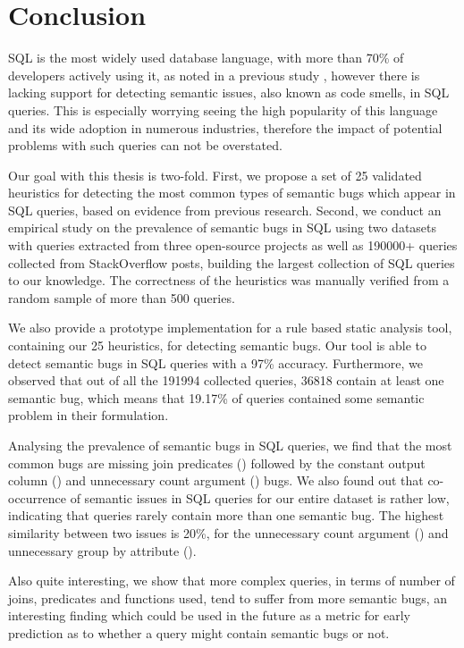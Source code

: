 \chapter{Conclusion}
\label{chapter:conclusion}

SQL is the most widely used database language, with more than 70\% of developers actively using it, as noted in a previous study \cite{P999}, however there is lacking support for detecting semantic issues, also known as code smells, in SQL queries. This is especially worrying seeing the high popularity of this language and its wide adoption in numerous industries, therefore the impact of potential problems with such queries can not be overstated.

Our goal with this thesis is two-fold. First, we propose a set of 25 validated heuristics for detecting the most common types of semantic bugs which appear in SQL queries, based on evidence from previous research. Second, we conduct an empirical study on the prevalence of semantic bugs in SQL using two datasets with queries extracted from three open-source projects as well as 190000+ queries collected from StackOverflow posts, building the largest collection of SQL queries to our knowledge. The correctness of the heuristics was manually verified from a random sample of more than 500 queries. 

We also provide a prototype implementation for a rule based static analysis tool, containing our 25 heuristics, for detecting semantic bugs. Our tool is able to detect semantic bugs in SQL queries with a 97\% accuracy. Furthermore, we observed that out of all the 191994 collected queries, 36818 contain at least one semantic bug, which means that 19.17\% of queries contained some semantic problem in their formulation. 

Analysing the prevalence of semantic bugs in SQL queries, we find that the most common bugs are missing join predicates () followed by the constant output column () and unnecessary count argument () bugs. We also found out that co-occurrence of semantic issues in SQL queries for our entire dataset is rather low, indicating that queries rarely contain more than one semantic bug. The highest similarity between two issues is 20\%, for the unnecessary count argument () and unnecessary group by attribute (). 

Also quite interesting, we show that more complex queries, in terms of number of joins, predicates and functions used, tend to suffer from more semantic bugs, an interesting finding which could be used in the future as a metric for early prediction as to whether a query might contain semantic bugs or not.


